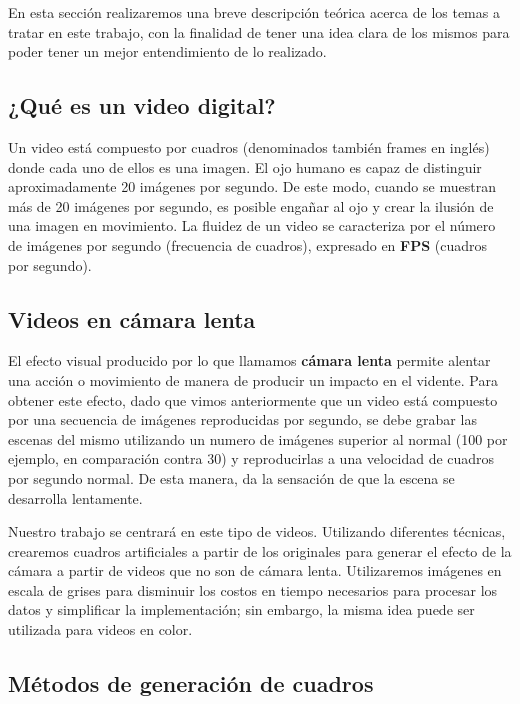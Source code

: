 En esta secci\'on realizaremos una breve descripci\'on te\'orica acerca de los temas a tratar en este trabajo, con la finalidad de tener una idea clara de los mismos para poder tener un mejor entendimiento de lo realizado.

\subsection{¿Qu\'e es un video digital?}

Un video est\'a compuesto por cuadros (denominados tambi\'en frames en ingl\'es) donde cada uno de ellos es una imagen. El ojo humano es capaz de distinguir aproximadamente 20 im\'agenes por segundo. De este modo, cuando se muestran m\'as de 20 imágenes por segundo, es posible enga\~nar al ojo y crear la ilusi\'on de una imagen en movimiento. La fluidez de un video se caracteriza por el número de im\'agenes por segundo (frecuencia de cuadros), expresado en \textbf{FPS} (cuadros por segundo). 

\subsection{Videos en c\'amara lenta}

El efecto visual producido por lo que llamamos \textbf{c\'amara lenta} permite alentar una acci\'on o movimiento de manera de producir un impacto en el vidente. Para obtener este efecto, dado que vimos anteriormente que un video est\'a compuesto por una secuencia de im\'agenes reproducidas por segundo, se debe grabar las escenas del mismo utilizando un numero de im\'agenes superior al normal (100 por ejemplo, en comparaci\'on contra 30) y reproducirlas a una velocidad de cuadros por segundo normal. De esta manera, da la sensaci\'on de que la escena se desarrolla lentamente. 

Nuestro trabajo se centrar\'a en este tipo de videos. Utilizando diferentes t\'ecnicas, crearemos cuadros artificiales a partir de los originales para generar el efecto de la c\'amara a partir de videos que no son de c\'amara lenta. Utilizaremos im\'agenes  en escala de grises para disminuir los costos en tiempo necesarios para procesar los datos y simplificar la implementaci\'on; sin embargo, la misma idea puede ser utilizada para videos en color.

\subsection{M\'etodos de generaci\'on de cuadros}

